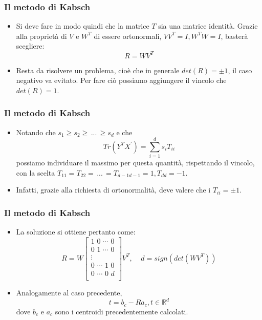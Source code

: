 \documentclass{beamer}
\begin{document}
\begin{frame}
\frametitle{Il metodo di Kabsch}
\begin{itemize}
	\item Si deve fare in modo quindi che la matrice $T$ sia una matrice identità.
	Grazie alla proprietà di $V$ e $W^T$ di essere ortonormali, $VV^T = I, W^TW = I$, basterà scegliere:
	\begin{equation}
	R = WV^T
	\end{equation}
	\item Resta da risolvere un problema, cioè che in generale $det(R) = \pm 1$, il caso negativo va evitato.
	Per fare ciò possiamo aggiungere il vincolo che $det(R) = 1$.
\end{itemize}
\end{frame}

\begin{frame}
\frametitle{Il metodo di Kabsch}
\begin{itemize}
	\item  Notando che $s_1 \ge s_2 \ge \, ... \, \ge s_d$ e che
	\begin{equation}
	Tr(Y^{T}X^{'}) = \sum_{i = 1}^{d} s_iT_{ii} 
	\end{equation}
	possiamo individuare il massimo per questa quantità, rispettando il vincolo, con la scelta $T_{11} = T_{22} = \, ... \, = T_{d-1d-1} = 1, T_{dd} = -1$.
	\item Infatti, grazie alla richiesta di ortonormalità, deve valere che i $T_{ii} = \pm 1$.
\end{itemize}
\end{frame}

\begin{frame}
\frametitle{Il metodo di Kabsch}
\begin{itemize}
	\item La soluzione si ottiene pertanto come:
	\begin{equation}
	R = W
	\begin{bmatrix}
	1 \,\, 0 \,\, \cdots \,\, 0\\
	0 \,\, 1 \,\, \cdots \,\, 0\\
	\vdots\\
	0 \,\, \cdots \,\, 1 \,\, 0\\
	0 \,\, \cdots \,\, 0 \,\, d\\
	\end{bmatrix}V^T
	,\; \; \; \; 
	d = sign(det(WV^T))
	\end{equation}
	
	\item Analogamente al caso precedente, 
	\begin{equation}
	t = b_c - Ra_c, t \in \mathbb{R}^d
	\end{equation}
	dove $b_c$ e $a_c$ sono i centroidi precedentemente calcolati.
\end{itemize}
\end{frame}
\end{document}
